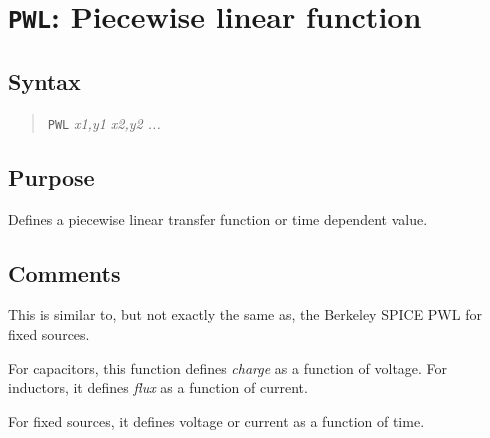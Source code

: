 %
%
%
%
\section{{\tt PWL}: Piecewise linear function}
\subsection{Syntax}
\begin{verse}
{\tt PWL} {\it x1,y1 x2,y2 ...}
\end{verse}
\subsection{Purpose}

Defines a piecewise linear transfer function or time dependent value.
\subsection{Comments}

This is similar to, but not exactly the same as, the Berkeley SPICE
PWL for fixed sources.

For capacitors, this function defines {\em charge} as a function of
voltage.  For inductors, it defines {\em flux} as a function of
current.

For fixed sources, it defines voltage or current as a function of
time.


